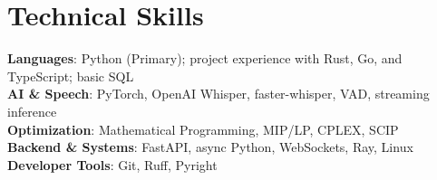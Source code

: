 \section{Technical Skills}
 \begin{itemize}[leftmargin=0.15in, label={}]
    \small{\item{
     \textbf{Languages}{: Python (Primary); project experience with Rust, Go, and TypeScript; basic SQL} \\
     \textbf{AI \& Speech}{: PyTorch, OpenAI Whisper, faster-whisper, VAD, streaming inference} \\
     \textbf{Optimization}{: Mathematical Programming, MIP/LP, CPLEX, SCIP} \\
     \textbf{Backend \& Systems}{: FastAPI, async Python, WebSockets, Ray, Linux} \\
     \textbf{Developer Tools}{: Git, Ruff, Pyright}
    }}
 \end{itemize}
